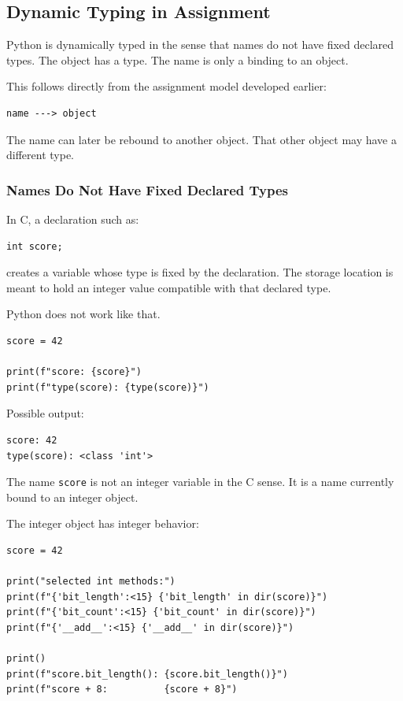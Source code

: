 \subsection{Dynamic Typing in Assignment}

Python is dynamically typed in the sense that names do not have fixed declared types. The object has a type. The name is only a binding to an object.

This follows directly from the assignment model developed earlier:

\begin{verbatim}
name ---> object
\end{verbatim}

The name can later be rebound to another object. That other object may have a different type.

\subsubsection{Names Do Not Have Fixed Declared Types}

In C, a declaration such as:

\begin{verbatim}
int score;
\end{verbatim}

creates a variable whose type is fixed by the declaration. The storage location is meant to hold an integer value compatible with that declared type.

Python does not work like that.

\begin{verbatim}
score = 42

print(f"score: {score}")
print(f"type(score): {type(score)}")
\end{verbatim}

Possible output:

\begin{verbatim}
score: 42
type(score): <class 'int'>
\end{verbatim}

The name \texttt{score} is not an integer variable in the C sense. It is a name currently bound to an integer object.

The integer object has integer behavior:

\begin{verbatim}
score = 42

print("selected int methods:")
print(f"{'bit_length':<15} {'bit_length' in dir(score)}")
print(f"{'bit_count':<15} {'bit_count' in dir(score)}")
print(f"{'__add__':<15} {'__add__' in dir(score)}")

print()
print(f"score.bit_length(): {score.bit_length()}")
print(f"score + 8:          {score + 8}")
\end{verbatim}

